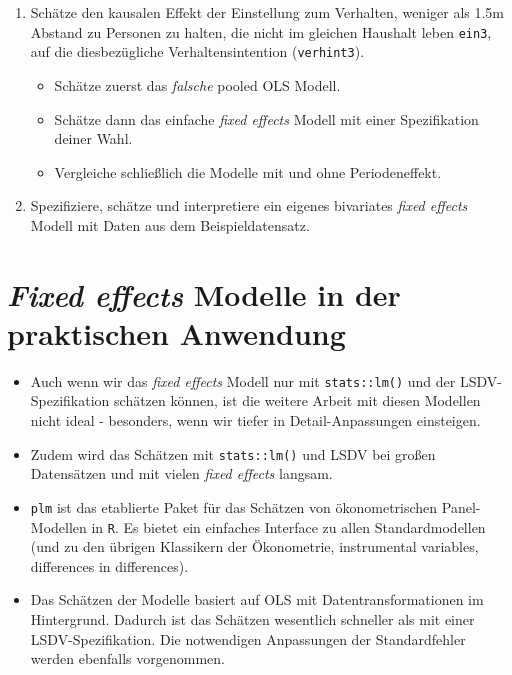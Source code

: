 \documentclass[
]{book}
\providecommand{\tightlist}{%
  \setlength{\itemsep}{0pt}\setlength{\parskip}{0pt}}
\begin{document}
\begin{enumerate}
\def\labelenumi{\arabic{enumi})}
\tightlist
\item
  Schätze den kausalen Effekt der Einstellung zum Verhalten, weniger als 1.5m Abstand zu Personen zu halten, die nicht im gleichen Haushalt leben \texttt{ein3}, auf die diesbezügliche Verhaltensintention (\texttt{verhint3}).

  \begin{itemize}
  \tightlist
  \item
    Schätze zuerst das \emph{falsche} pooled OLS Modell.
  \item
    Schätze dann das einfache \emph{fixed effects} Modell mit einer Spezifikation deiner Wahl.
  \item
    Vergleiche schließlich die Modelle mit und ohne Periodeneffekt.
  \end{itemize}
\item
  Spezifiziere, schätze und interpretiere ein eigenes bivariates \emph{fixed effects} Modell mit Daten aus dem Beispieldatensatz.
\end{enumerate}

\hypertarget{fixed-effects-modelle-in-der-praktischen-anwendung}{%
\section{\texorpdfstring{\emph{Fixed effects} Modelle in der praktischen Anwendung}{Fixed effects Modelle in der praktischen Anwendung}}\label{fixed-effects-modelle-in-der-praktischen-anwendung}}

\begin{itemize}
\tightlist
\item
  Auch wenn wir das \emph{fixed effects} Modell nur mit \texttt{stats::lm()} und der LSDV-Spezifikation schätzen können, ist die weitere Arbeit mit diesen Modellen nicht ideal - besonders, wenn wir tiefer in Detail-Anpassungen einsteigen.
\item
  Zudem wird das Schätzen mit \texttt{stats::lm()} und LSDV bei großen Datensätzen und mit vielen \emph{fixed effects} langsam.
\item
  \texttt{plm} \citep{R-plm} ist das etablierte Paket für das Schätzen von ökonometrischen Panel-Modellen in \texttt{R}. Es bietet ein einfaches Interface zu allen Standardmodellen (und zu den übrigen Klassikern der Ökonometrie, instrumental variables, differences in differences).
\item
  Das Schätzen der Modelle basiert auf OLS mit Datentransformationen im Hintergrund. Dadurch ist das Schätzen wesentlich schneller als mit einer LSDV-Spezifikation. Die notwendigen Anpassungen der Standardfehler werden ebenfalls vorgenommen.
\end{itemize}
\end{document}
